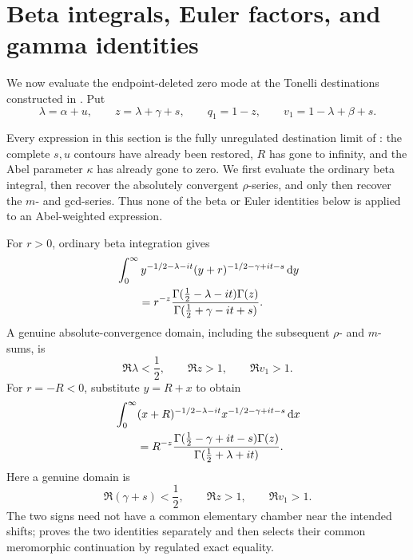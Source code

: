\section{Beta integrals, Euler factors, and gamma identities}
\label{sec:beta}

We now evaluate the endpoint-deleted zero mode at the Tonelli destinations
constructed in .  Put
\begin{equation}\label{eq:lambda-z-qv}
 \lambda=\alpha+u,\qquad z=\lambda+\gamma+s,\qquad
 q_1=1-z,\qquad v_1=1-\lambda+\beta+s.
\end{equation}

Every expression in this section is the fully unregulated destination limit
of : the complete $s,u$ contours
have already been restored, $R$ has gone to infinity, and the Abel parameter
$\kappa$ has already gone to zero.  We first evaluate the ordinary beta
integral, then recover the absolutely convergent $\rho$-series, and only then
recover the $m$- and gcd-series.  Thus none of the beta or Euler identities
below is applied to an Abel-weighted expression.

For $r>0$, ordinary beta integration gives
\begin{align}
 &\int_0^\infty y^{-1/2-\lambda-it}
 (y+r)^{-1/2-\gamma+it-s}\,\mathrm d y \notag\\
 &\qquad=r^{-z}
 \frac{\Gamma(\frac12-\lambda-it)\Gamma(z)}
      {\Gamma(\frac12+\gamma-it+s)}.
 \label{eq:beta-positive}
\end{align}
A genuine absolute-convergence domain, including the subsequent $\rho$- and
$m$-sums, is
\begin{equation}\label{eq:beta-positive-domain}
 \Re\lambda<\frac12,\qquad \Re z>1,\qquad \Re v_1>1.
\end{equation}
For $r=-R<0$, substitute $y=R+x$ to obtain
\begin{align}
 &\int_0^\infty(x+R)^{-1/2-\lambda-it}
 x^{-1/2-\gamma+it-s}\,\mathrm d x \notag\\
 &\qquad=R^{-z}
 \frac{\Gamma(\frac12-\gamma+it-s)\Gamma(z)}
      {\Gamma(\frac12+\lambda+it)}.
 \label{eq:beta-negative}
\end{align}
Here a genuine domain is
\begin{equation}\label{eq:beta-negative-domain}
 \Re(\gamma+s)<\frac12,\qquad \Re z>1,\qquad \Re v_1>1.
\end{equation}
The two signs need not have a common elementary chamber near the intended
shifts;  proves the two identities separately and then
selects their common meromorphic continuation by regulated exact equality.

